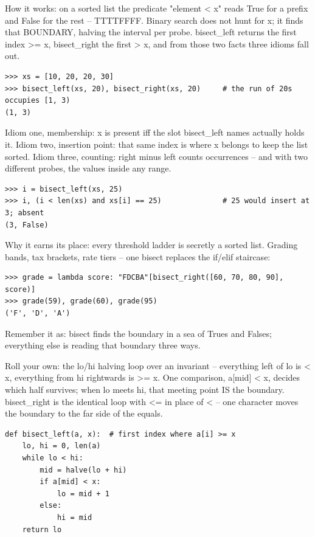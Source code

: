 \documentclass[10pt,letterpaper]{book}
\begin{document}
How it works: on a sorted list the predicate "element < x" reads True for a prefix and False for the rest -- TTTTFFFF. Binary search does not hunt for x; it finds that BOUNDARY, halving the interval per probe. bisect\_left returns the first index >= x, bisect\_right the first > x, and from those two facts three idioms fall out.

\begin{lstlisting}[style=ex]
>>> xs = [10, 20, 20, 30]
>>> bisect_left(xs, 20), bisect_right(xs, 20)     # the run of 20s occupies [1, 3)
(1, 3)
\end{lstlisting}

Idiom one, membership: x is present iff the slot bisect\_left names actually holds it. Idiom two, insertion point: that same index is where x belongs to keep the list sorted. Idiom three, counting: right minus left counts occurrences -- and with two different probes, the values inside any range.

\begin{lstlisting}[style=ex]
>>> i = bisect_left(xs, 25)
>>> i, (i < len(xs) and xs[i] == 25)              # 25 would insert at 3; absent
(3, False)
\end{lstlisting}

Why it earns its place: every threshold ladder is secretly a sorted list. Grading bands, tax brackets, rate tiers -- one bisect replaces the if/elif staircase:

\begin{lstlisting}[style=ex]
>>> grade = lambda score: "FDCBA"[bisect_right([60, 70, 80, 90], score)]
>>> grade(59), grade(60), grade(95)
('F', 'D', 'A')
\end{lstlisting}

Remember it as: bisect finds the boundary in a sea of Trues and Falses; everything else is reading that boundary three ways.


Roll your own: the lo/hi halving loop over an invariant -- everything left of lo is < x, everything from hi rightwards is >= x. One comparison, a[mid] < x, decides which half survives; when lo meets hi, that meeting point IS the boundary. bisect\_right is the identical loop with <= in place of < -- one character moves the boundary to the far side of the equals.

\begin{lstlisting}[style=ex]
def bisect_left(a, x):  # first index where a[i] >= x
    lo, hi = 0, len(a)
    while lo < hi:
        mid = halve(lo + hi)
        if a[mid] < x:
            lo = mid + 1
        else:
            hi = mid
    return lo
\end{lstlisting}
\end{document}
